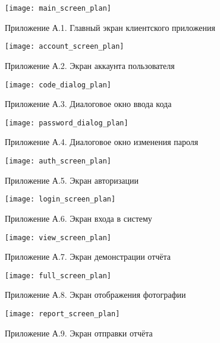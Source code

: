 

\begin{figure}[!htbp]
	\texttt{[image: main\_screen\_plan]}
	\centering
	\caption*{Приложение А.1. Главный экран клиентского приложения}
\end{figure}

\begin{figure}[!htbp]
	\texttt{[image: account\_screen\_plan]}
	\centering
	\caption*{Приложение А.2. Экран аккаунта пользователя}
\end{figure}

\begin{figure}[!htbp]
	\texttt{[image: code\_dialog\_plan]}
	\centering
	\caption*{Приложение А.3. Диалоговое окно ввода кода}
\end{figure}

\begin{figure}[!htbp]
	\texttt{[image: password\_dialog\_plan]}
	\centering
	\caption*{Приложение А.4. Диалоговое окно изменения пароля}
\end{figure}

\begin{figure}[!htbp]
	\texttt{[image: auth\_screen\_plan]}
	\centering
	\caption*{Приложение А.5. Экран авторизации}
\end{figure}

\begin{figure}[!htbp]
	\texttt{[image: login\_screen\_plan]}
	\centering
	\caption*{Приложение А.6. Экран входа в систему}
\end{figure}

\begin{figure}[!htbp]
	\texttt{[image: view\_screen\_plan]}
	\centering
	\caption*{Приложение А.7. Экран демонстрации отчёта}
\end{figure}

\begin{figure}[!htbp]
	\texttt{[image: full\_screen\_plan]}
	\centering
	\caption*{Приложение А.8. Экран отображения фотографии}
\end{figure}

\begin{figure}[!htbp]
	\texttt{[image: report\_screen\_plan]}
	\centering
	\caption*{Приложение А.9. Экран отправки отчёта}
\end{figure}

